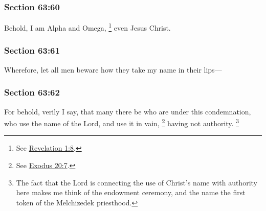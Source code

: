 	\subsubsection{Section 63:60} %
		\label{DC63-60}

		Behold, I am Alpha and Omega,%
			\footnote{%
				See \hyperref[REVELATIONNT-1-8]{Revelation 1:8}.
				}
		even Jesus Christ.


	\subsubsection{Section 63:61} %
		\label{DC63-61}

		Wherefore, let all men beware how they take my name in their lips---


	\subsubsection{Section 63:62} %
		\label{DC63-62}

		For behold, verily I say, that many there be who are under this condemnation, who use the name of the Lord, and use it in vain,%
			\footnote{%
				See \hyperref[EXODUS-20-7]{Exodus 20:7}.
				}
		having not authority.%
			\footnote{%
				The fact that the Lord is connecting the use of Christ's name with authority here makes me think of the endowment ceremony, and the name the first token of the Melchizedek priesthood.
				}


